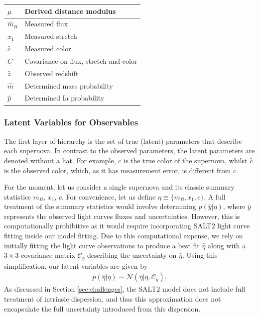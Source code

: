 \documentclass[a4paper,fleqn,usenatbib]{emulateapj}
\begin{document}
\begin{table}
\begin{tabular}{ll}
		$\mu$ & Derived distance modulus \\
		\hline
		$\hat{m}_B$ & Measured flux\\
		$\hat{x}_1$ & Measured stretch \\
		$\hat{c}$ & Measured color \\
		$C$ & Covariance on flux, stretch and color \\
		$\hat{z}$ & Observed redshift \\
		$\hat{m}$ & Determined mass probability \\
		$\hat{p}$ & Determined Ia probability \\
		\hline
	\end{tabular}
\end{table}


\subsubsection{Latent Variables for Observables}

The first layer of hierarchy is the set of true (latent) parameters that describe each supernova. In contrast to the observed parameters, the latent parameters are denoted without a hat. For example, $c$ is the true color of the supernova, whilst $\hat{c}$ is the observed color, which, as it has measurement error, is different from $c$.

For the moment, let us consider a single supernova and its classic summary statistics $m_B$, $x_1$, $c$. For convenience, let us define $\eta \equiv \lbrace m_B, x_1, c \rbrace$. A full treatment of the summary statistics would involve determining $p(\hat{y}|\eta)$, where $\hat{y}$ represents the observed light curves fluxes and uncertainties. However, this is computationally prohibitive  as it would require incorporating SALT2 light curve fitting inside our model fitting. Due to this computational expense, we rely on initially fitting the light curve observations to produce a best fit $\hat{\eta}$ along with a $3\times3$ covariance matrix $\mathcal{C_\eta}$ describing the uncertainty on $\hat{\eta}$. Using this simplification, our latent variables are given by
\begin{align}
p(\hat{\eta}|\eta) \sim \mathcal{N}(\hat{\eta} | \eta, \mathcal{C_\eta}). \label{eq:pop}
\end{align}
As discussed in Section \ref{sec:challenges},  the SALT2 model does not include full treatment of intrinsic dispersion, and thus this approximation does not encapsulate the full uncertainty introduced from this dispersion.
\end{document}
